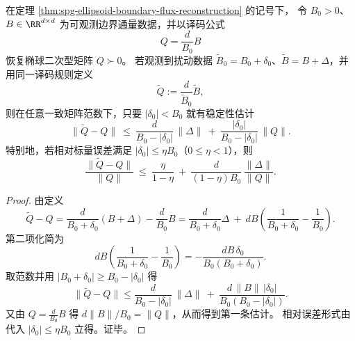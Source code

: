 
\begin{theorem}[椭球边界通量矩阵译码的扰动稳定性]\label{thm:spg-ellipsoid-flux-decoding-perturbation-stability}
在定理 \ref{thm:spg-ellipsoid-boundary-flux-reconstruction} 的记号下，
令 \(B_0>0\)、\(B\in\RR^{d\times d}\) 为可观测边界通量数据，并以译码公式
\[
Q=\frac{d}{B_0}B
\]
恢复椭球二次型矩阵 \(Q\succ 0\)。
若观测到扰动数据 \(\widetilde B_0=B_0+\delta_0\)、\(\widetilde B=B+\Delta\)，并用同一译码规则定义
\[
\widetilde Q:=\frac{d}{\widetilde B_0}\widetilde B,
\]
则在任意一致矩阵范数下，只要 \(|\delta_0|<B_0\) 就有稳定性估计
\[
\|\widetilde Q-Q\|
\ \le\
\frac{d}{B_0-|\delta_0|}\,\|\Delta\|
\ +\
\frac{|\delta_0|}{B_0-|\delta_0|}\,\|Q\|.
\]
特别地，若相对标量误差满足 \(|\delta_0|\le \eta B_0\)（\(0\le\eta<1\)），则
\[
\frac{\|\widetilde Q-Q\|}{\|Q\|}
\ \le\
\frac{\eta}{1-\eta}
\ +\
\frac{d}{(1-\eta)B_0}\,\frac{\|\Delta\|}{\|Q\|}.
\]
\end{theorem}
\begin{proof}
由定义
\[
\widetilde Q-Q
=\frac{d}{B_0+\delta_0}(B+\Delta)-\frac{d}{B_0}B
=\frac{d}{B_0+\delta_0}\Delta
\ +\
dB\left(\frac{1}{B_0+\delta_0}-\frac{1}{B_0}\right).
\]
第二项化简为
\[
dB\left(\frac{1}{B_0+\delta_0}-\frac{1}{B_0}\right)
=-\frac{dB\,\delta_0}{B_0(B_0+\delta_0)}.
\]
取范数并用 \(|B_0+\delta_0|\ge B_0-|\delta_0|\) 得
\[
\|\widetilde Q-Q\|
\le
\frac{d}{B_0-|\delta_0|}\,\|\Delta\|
\ +\
\frac{d\,\|B\|\,|\delta_0|}{B_0(B_0-|\delta_0|)}.
\]
又由 \(Q=\frac{d}{B_0}B\) 得 \(d\|B\|/B_0=\|Q\|\)，从而得到第一条估计。
相对误差形式由代入 \(|\delta_0|\le \eta B_0\) 立得。证毕。
\end{proof}

\endinput

